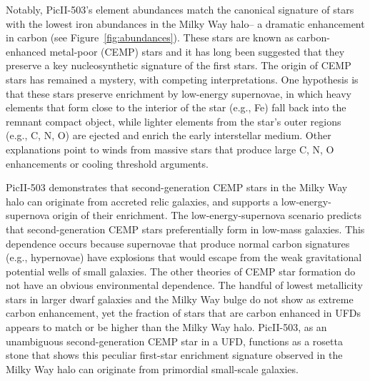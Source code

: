 \documentclass[pdflatex,sn-nature]{sn-jnl}%
\theoremstyle{thmstyleone}%
\theoremstyle{thmstyletwo}%
\theoremstyle{thmstylethree}%
\begin{document}
Notably, PicII-503's element abundances match the canonical signature of stars with the lowest iron abundances in the Milky Way halo-- a dramatic enhancement in carbon (see Figure~\ref{fig:abundances})\cite{bc+05}.
These stars are known as carbon-enhanced metal-poor (CEMP) stars and it has long been suggested that they preserve a key nucleosynthetic signature of the first stars\cite{cm+14}.
The origin of CEMP stars has remained a mystery, with competing interpretations\cite{iut+05,mem+06}.
One hypothesis is that these stars preserve enrichment by low-energy supernovae, in which heavy elements that form close to the interior of the star (e.g., Fe) fall back into the remnant compact object, while lighter elements from the star’s outer regions (e.g., C, N, O) are ejected and enrich the early interstellar medium\cite{iut+05}.
Other explanations point to winds from massive stars that produce large C, N, O enhancements\cite{mem+06} or cooling threshold arguments\cite{bl+03, fjb+07, hy+19}.

PicII-503 demonstrates that second-generation CEMP stars in the Milky Way halo can originate from accreted relic galaxies, and supports a low-energy-supernova origin of their enrichment.
The low-energy-supernova scenario predicts that second-generation CEMP stars preferentially form in low-mass galaxies.
This dependence occurs because supernovae that produce normal carbon signatures (e.g., hypernovae\cite{hw+10,ssa+21,svs+24}) have explosions that would escape from the weak gravitational potential wells of small galaxies\cite{cm+14}. 
The other theories of CEMP star formation do not have an obvious environmental dependence.
The handful of lowest metallicity stars in larger dwarf galaxies and the Milky Way bulge do not show as extreme carbon enhancement\cite{hck+15,jnm+15,asa+21,svs+24,cml+24,sav+24}, yet the fraction of stars that are carbon enhanced in UFDs appears to match or be higher than the Milky Way halo\cite{jls+20,ljs+24}.
PicII-503, as an unambiguous second-generation CEMP star in a UFD, functions as a rosetta stone that shows this peculiar first-star enrichment signature observed in the Milky Way halo can originate from primordial small-scale galaxies. 
\end{document}
